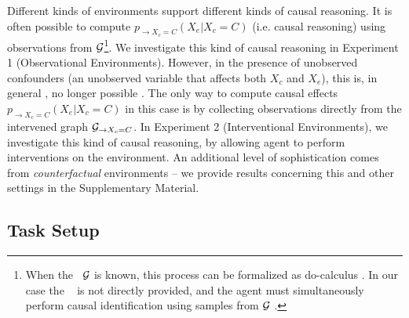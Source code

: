 Different kinds of environments support different kinds of causal reasoning. It is often possible to compute $p_{\rightarrow X_c = C}(X_e|X_c = C)$ (i.e. causal reasoning) using observations from ${\cal G}$\footnote{When the \CBN~${\cal G}$ is known, this process can be formalized as do-calculus \citep{pearl2000,pearl16causal}. In our case the \CBN~ is not directly provided, and the agent must simultaneously perform causal identification using samples from ${\cal G}$ \citep{heckerman1995learning}.}. We investigate this kind of causal reasoning in Experiment 1 (Observational Environments). However, in the presence of unobserved confounders (an unobserved variable that affects both $X_c$ and $X_e$), this is, in general , no longer possible \citep{pearl2000}. The only way to compute causal effects $p_{\rightarrow X_c = C}(X_e|X_c = C)$ in this case is by collecting observations directly from the intervened graph ${\cal G}_{\rightarrow X_c = C}$. In Experiment 2 (Interventional Environments), we investigate this kind of causal reasoning, by allowing agent to perform interventions on the environment. An additional level of sophistication comes from \textit{counterfactual} environments -- we provide results concerning this and other settings in the Supplementary Material.


\subsection{Task Setup}
\label{sec:task}

